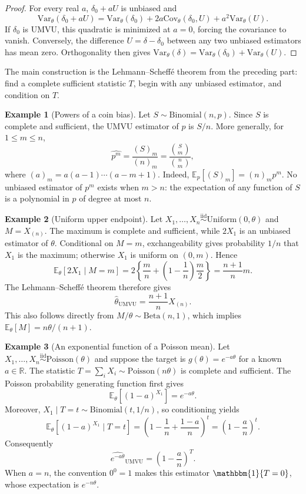 \documentclass[12pt,oneside]{book}
\numberwithin{equation}{section}
\theoremstyle{definition}
\newtheorem{example}{Example}[section]
\theoremstyle{plain}
\theoremstyle{remark}
\newcommand{\R}{\mathbb{R}}
\newcommand{\E}{\mathbb{E}}
\newcommand{\Var}{\mathrm{Var}}
\newcommand{\Cov}{\mathrm{Cov}}
\newcommand{\ind}{\mathbbm{1}}
\newcommand{\iid}{\overset{\text{iid}}{\sim}}
\newcommand{\Bin}{\mathrm{Binomial}}
\newcommand{\Pois}{\mathrm{Poisson}}
\begin{document}
\begin{proof}
For every real $a$, $\delta_0+aU$ is unbiased and
\[
 \Var_\theta(\delta_0+aU)
 =\Var_\theta(\delta_0)+2a\Cov_\theta(\delta_0,U)
  +a^2\Var_\theta(U).
\]
If $\delta_0$ is UMVU, this quadratic is minimized at $a=0$, forcing the
covariance to vanish.  Conversely, the difference $U=\delta-\delta_0$ between
any two unbiased estimators has mean zero.  Orthogonality then gives
$\Var_\theta(\delta)=\Var_\theta(\delta_0)+\Var_\theta(U)$.
\end{proof}

The main construction is the Lehmann--Scheff\'e theorem from the preceding
part: find a complete sufficient statistic $T$, begin with any unbiased
estimator, and condition on $T$.

\begin{example}[Powers of a coin bias]
Let $S\sim\Bin(n,p)$.  Since $S$ is complete and sufficient, the UMVU
estimator of $p$ is $S/n$.  More generally, for $1\leq m\leq n$,
\[
    \widehat{p^m}=\frac{(S)_m}{(n)_m}
    =\frac{\binom Sm}{\binom nm},
\]
where $(a)_m=a(a-1)\cdots(a-m+1)$.  Indeed,
$\E_p[(S)_m]=(n)_mp^m$.  No unbiased estimator of $p^m$ exists when $m>n$:
the expectation of any function of $S$ is a polynomial in $p$ of degree at
most $n$.
\end{example}

\begin{example}[Uniform upper endpoint]
Let $X_1,\ldots,X_n\iid\mathrm{Uniform}(0,\theta)$ and
$M=X_{(n)}$.  The maximum is complete and sufficient, while $2X_1$ is an
unbiased estimator of $\theta$.  Conditional on $M=m$, exchangeability gives
probability $1/n$ that $X_1$ is the maximum; otherwise $X_1$ is uniform on
$(0,m)$.  Hence
\[
 \E_\theta[2X_1\mid M=m]
 =2\left\{\frac{m}{n}+\left(1-\frac1n\right)\frac m2\right\}
 =\frac{n+1}{n}m.
\]
The Lehmann--Scheff\'e theorem therefore gives
\[
 \widehat\theta_{\mathrm{UMVU}}=\frac{n+1}{n}X_{(n)}.
\]
This also follows directly from $M/\theta\sim\mathrm{Beta}(n,1)$, which implies
$\E_\theta[M]=n\theta/(n+1)$.
\end{example}

\begin{example}[An exponential function of a Poisson mean]
Let $X_1,\ldots,X_n\iid\Pois(\theta)$ and suppose the target is
$g(\theta)=e^{-a\theta}$ for a known $a\in\R$.  The statistic
$T=\sum_iX_i\sim\Pois(n\theta)$ is complete and sufficient.  The Poisson
probability generating function first gives
\[
 \E_\theta[(1-a)^{X_1}]=e^{-a\theta}.
\]
Moreover, $X_1\mid T=t\sim\Bin(t,1/n)$, so conditioning yields
\[
 \E_\theta[(1-a)^{X_1}\mid T=t]
 =\left(1-\frac1n+\frac{1-a}{n}\right)^t
 =\left(1-\frac an\right)^t.
\]
Consequently
\[
 \widehat{e^{-a\theta}}_{\mathrm{UMVU}}
 =\left(1-\frac an\right)^T.
\]
When $a=n$, the convention $0^0=1$ makes this estimator
$\ind\{T=0\}$, whose expectation is $e^{-n\theta}$.
\end{example}
\end{document}

